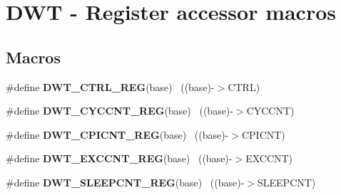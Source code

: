 \hypertarget{group___d_w_t___register___accessor___macros}{}\section{D\+W\+T -\/ Register accessor macros}
\label{group___d_w_t___register___accessor___macros}
\subsection*{Macros}
\begin{DoxyCompactItemize}
\item 
\hypertarget{group___d_w_t___register___accessor___macros_ga805e8330d1aa986d534abe1eed2614df}{}\#define {\bfseries D\+W\+T\+\_\+\+C\+T\+R\+L\+\_\+\+R\+E\+G}(base)                                          ~((base)-\/$>$C\+T\+R\+L)\label{group___d_w_t___register___accessor___macros_ga805e8330d1aa986d534abe1eed2614df}

\item 
\hypertarget{group___d_w_t___register___accessor___macros_ga745c3ae737eb0e94dde4b3e1178920af}{}\#define {\bfseries D\+W\+T\+\_\+\+C\+Y\+C\+C\+N\+T\+\_\+\+R\+E\+G}(base)                                      ~((base)-\/$>$C\+Y\+C\+C\+N\+T)\label{group___d_w_t___register___accessor___macros_ga745c3ae737eb0e94dde4b3e1178920af}

\item 
\hypertarget{group___d_w_t___register___accessor___macros_ga57a7caeb5e0d4038c88b5adb8a31ac4e}{}\#define {\bfseries D\+W\+T\+\_\+\+C\+P\+I\+C\+N\+T\+\_\+\+R\+E\+G}(base)                                      ~((base)-\/$>$C\+P\+I\+C\+N\+T)\label{group___d_w_t___register___accessor___macros_ga57a7caeb5e0d4038c88b5adb8a31ac4e}

\item 
\hypertarget{group___d_w_t___register___accessor___macros_gacfd254c94211e8165496d8c22a02b996}{}\#define {\bfseries D\+W\+T\+\_\+\+E\+X\+C\+C\+N\+T\+\_\+\+R\+E\+G}(base)                                      ~((base)-\/$>$E\+X\+C\+C\+N\+T)\label{group___d_w_t___register___accessor___macros_gacfd254c94211e8165496d8c22a02b996}

\item 
\hypertarget{group___d_w_t___register___accessor___macros_gad4f054164e8c0594edcc3672d3122903}{}\#define {\bfseries D\+W\+T\+\_\+\+S\+L\+E\+E\+P\+C\+N\+T\+\_\+\+R\+E\+G}(base)                                  ~((base)-\/$>$S\+L\+E\+E\+P\+C\+N\+T)\label{group___d_w_t___register___accessor___macros_gad4f054164e8c0594edcc3672d3122903}


\end{DoxyCompactItemize}
